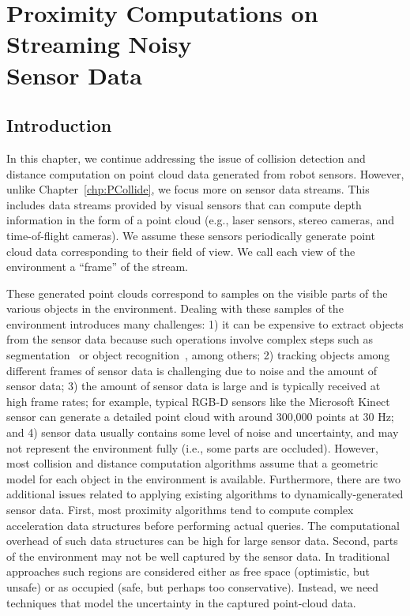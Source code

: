 \chapter{Proximity Computations on Streaming Noisy \\ Sensor Data}
\label{chp:PCollide2}


\section{Introduction}

In this chapter, we continue addressing
the issue of collision detection and distance computation on point cloud data generated from robot sensors. However, unlike Chapter~\ref{chp:PCollide}, we focus more on sensor data streams.
This includes data streams provided by visual sensors that can compute depth information in the form of a point cloud (e.g., laser sensors, stereo
cameras, and time-of-flight cameras). We assume these
sensors periodically generate point cloud data corresponding to their
field of view. We call each view of the environment a ``frame'' of the stream.

These generated point clouds correspond to samples on the visible parts
of the various objects in the environment. Dealing with these samples
of the environment introduces many challenges: 1) it can be expensive
to extract objects from the sensor data because such operations involve
complex steps such as segmentation~\cite{Rusu:2009:IROS} or object
recognition~\cite{Muja:2011:ICRA}, among others; 2) tracking objects
among different frames of sensor data is challenging due to noise and the
amount of sensor data; 3) the amount of sensor data is large and is typically
received at high frame rates; for example, typical RGB-D sensors like
the Microsoft Kinect  sensor can generate a detailed point
cloud with around 300,000 points at 30 Hz; and 4) sensor data usually
contains some level of noise and uncertainty, and may not represent
the environment fully (i.e., some parts are occluded). However, most
collision and distance computation algorithms assume that a geometric
model for each object in the environment is available. Furthermore,
there are two additional issues related to applying existing
algorithms to dynamically-generated sensor data. First, most proximity
algorithms tend to compute complex acceleration data structures before
performing actual queries. The computational overhead of such data structures can be high for large sensor data. Second, parts of the environment may not be well captured by the sensor data. In
traditional approaches such regions are considered either as
free space (optimistic, but unsafe) or as occupied (safe, but perhaps
too conservative). Instead, we need techniques that model the uncertainty in the captured point-cloud data.

